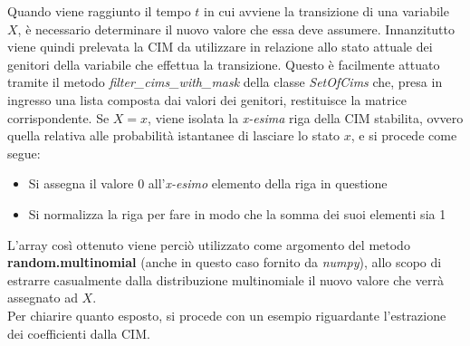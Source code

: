   Quando viene raggiunto il tempo $t$ in cui avviene la transizione di una variabile $X$, è necessario determinare
  il nuovo valore che essa deve assumere. Innanzitutto viene quindi prelevata la CIM
  da utilizzare in relazione allo stato attuale dei genitori della variabile che effettua la transizione.
  Questo è facilmente attuato tramite il metodo \textit{filter\_cims\_with\_mask} della classe \textit{SetOfCims}
  che, presa in ingresso una lista composta dai valori dei genitori, restituisce la matrice corrispondente.
  Se $X = x$, viene isolata la \textit{x-esima} riga della CIM stabilita, ovvero quella relativa alle
  probabilità istantanee di lasciare lo stato $x$, e si procede come segue:

  \begin{itemize}
    \item Si assegna il valore 0 all'\textit{x-esimo} elemento della riga in questione
    \item Si normalizza la riga per fare in modo che la somma dei suoi elementi sia 1
  \end{itemize}

  L'array così ottenuto viene perciò utilizzato come argomento del metodo \textbf{random.multinomial}
  (anche in questo caso fornito da \textit{numpy}), allo scopo di estrarre casualmente dalla distribuzione multinomiale
  il nuovo valore che verrà assegnato ad $X$.\\
  Per chiarire quanto esposto, si procede con un esempio riguardante l'estrazione dei coefficienti dalla CIM.

